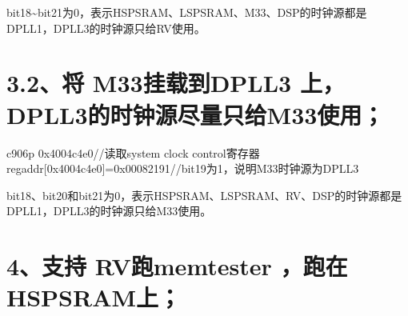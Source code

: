 \documentclass[letterpaper,10pt,english]{sphinxmanual}
\begin{document}
\sphinxAtStartPar
bit18\textasciitilde{}bit21为0，表示HSPSRAM、LSPSRAM、M33、DSP的时钟源都是DPLL1，DPLL3的时钟源只给RV使用。


\section{3.2、将 M33挂载到DPLL3 上，DPLL3的时钟源尽量只给M33使用；}
\label{\detokenize{r128_u9a8c_u8bc1_u56fa_u4ef6/r128_u9a8c_u8bc1_u56fa_u4ef6_u5f00_u53d1_u6307_u5357:m33dpll3-dpll3m33}}
\sphinxAtStartPar
{}

\begin{sphinxVerbatim}[commandchars=\\\{\}]
c906\PYGZgt{}p 0x4004c4e0//读取system clock control寄存器
reg\PYGZus{}addr[0x4004c4e0]=0x00082191//bit19为1，说明M33时钟源为DPLL3
\end{sphinxVerbatim}

\sphinxAtStartPar
{}

\sphinxAtStartPar
bit18、bit20和bit21为0，表示HSPSRAM、LSPSRAM、RV、DSP的时钟源都是DPLL1，DPLL3的时钟源只给M33使用。


\section{4、支持 RV跑memtester ，跑在HS\sphinxhyphen{}PSRAM上；}
\label{\detokenize{r128_u9a8c_u8bc1_u56fa_u4ef6/r128_u9a8c_u8bc1_u56fa_u4ef6_u5f00_u53d1_u6307_u5357:id4}}
\sphinxAtStartPar
{}
\end{document}
